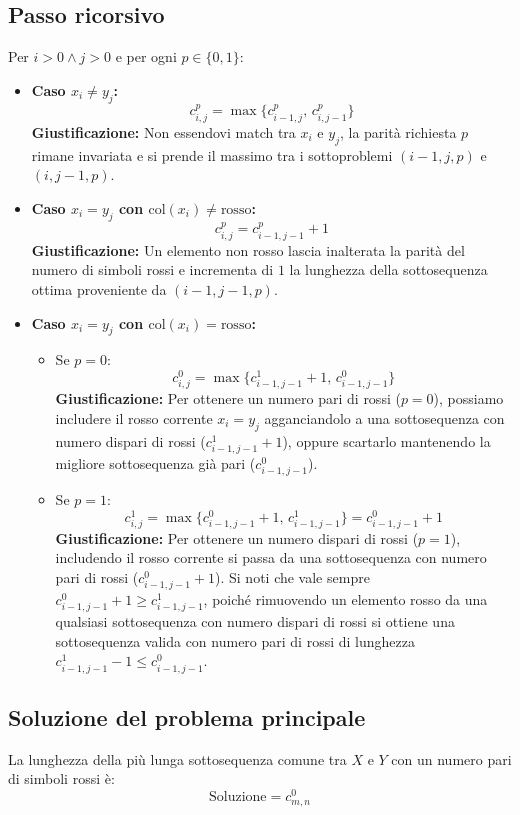 \subsection{Passo ricorsivo}
Per $i > 0 \land j > 0$ e per ogni $p \in \{0, 1\}$:
\begin{itemize}
    \item \textbf{Caso $x_i \neq y_j$:}
    \[
        c_{i,j}^p = \max \{ c_{i-1, j}^p, \, c_{i, j-1}^p \}
    \]
    \textbf{Giustificazione:} Non essendovi match tra $x_i$ e $y_j$, la parità richiesta $p$ rimane invariata e si prende il massimo tra i sottoproblemi $(i-1, j, p)$ e $(i, j-1, p)$.

    \item \textbf{Caso $x_i = y_j$ con $\text{col}(x_i) \neq \text{rosso}$:}
    \[
        c_{i,j}^p = c_{i-1, j-1}^p + 1
    \]
    \textbf{Giustificazione:} Un elemento non rosso lascia inalterata la parità del numero di simboli rossi e incrementa di $1$ la lunghezza della sottosequenza ottima proveniente da $(i-1, j-1, p)$.

    \item \textbf{Caso $x_i = y_j$ con $\text{col}(x_i) = \text{rosso}$:}
    \begin{itemize}
        \item Se $p = 0$:
        \[
            c_{i,j}^0 = \max \{ c_{i-1, j-1}^1 + 1, \, c_{i-1, j-1}^0 \}
        \]
        \textbf{Giustificazione:} Per ottenere un numero pari di rossi ($p=0$), possiamo includere il rosso corrente $x_i = y_j$ agganciandolo a una sottosequenza con numero dispari di rossi ($c_{i-1, j-1}^1 + 1$), oppure scartarlo mantenendo la migliore sottosequenza già pari ($c_{i-1, j-1}^0$).
        \item Se $p = 1$:
        \[
            c_{i,j}^1 = \max \{ c_{i-1, j-1}^0 + 1, \, c_{i-1, j-1}^1 \} = c_{i-1, j-1}^0 + 1
        \]
        \textbf{Giustificazione:} Per ottenere un numero dispari di rossi ($p=1$), includendo il rosso corrente si passa da una sottosequenza con numero pari di rossi ($c_{i-1, j-1}^0 + 1$). Si noti che vale sempre $c_{i-1, j-1}^0 + 1 \ge c_{i-1, j-1}^1$, poiché rimuovendo un elemento rosso da una qualsiasi sottosequenza con numero dispari di rossi si ottiene una sottosequenza valida con numero pari di rossi di lunghezza $c_{i-1, j-1}^1 - 1 \le c_{i-1, j-1}^0$.
    \end{itemize}
\end{itemize}

\subsection{Soluzione del problema principale}
La lunghezza della più lunga sottosequenza comune tra $X$ e $Y$ con un numero pari di simboli rossi è:
\[
    \text{Soluzione} = c_{m, n}^0
\]

